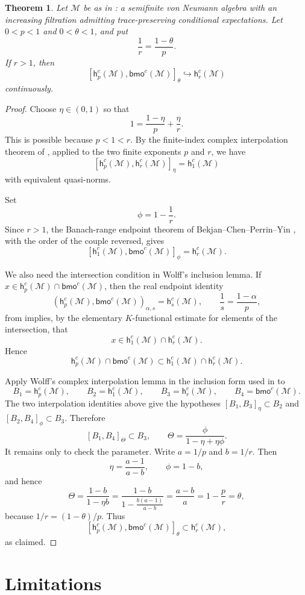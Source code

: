 \documentclass[11pt]{article}
\newcommand{\M}{\mathcal M}
\newcommand{\h}{\mathsf h}
\newcommand{\bmo}{\mathsf{bmo}}
\newtheorem{theorem}{Theorem}
\begin{document}
\begin{theorem}
Let \(\M\) be as in \cite{Ran2021}: a semifinite von Neumann algebra with an
increasing filtration admitting trace-preserving conditional expectations.
Let \(0<p<1\) and \(0<\theta<1\), and put
\[
  \frac1r=\frac{1-\theta}{p}.
\]
If \(r>1\), then
\[
[\h_p^c(\M),\bmo^c(\M)]_\theta
  \hookrightarrow \h_r^c(\M)
\]
continuously.
\end{theorem}

\begin{proof}
Choose \(\eta\in(0,1)\) so that
\[
  1=\frac{1-\eta}{p}+\frac{\eta}{r}.
\]
This is possible because \(p<1<r\).  By the finite-index complex
interpolation theorem of \cite[Theorem 3.16]{Ran2021}, applied to the two
finite exponents \(p\) and \(r\), we have
\[
[\h_p^c(\M),\h_r^c(\M)]_\eta=\h_1^c(\M)
\]
with equivalent quasi-norms.

Set
\[
  \phi=1-\frac1r.
\]
Since \(r>1\), the Banach-range endpoint theorem of
Bekjan--Chen--Perrin--Yin \cite[Theorem 4.4]{BCPY2009}, with the order of
the couple reversed, gives
\[
[\h_1^c(\M),\bmo^c(\M)]_\phi=\h_r^c(\M).
\]

We also need the intersection condition in Wolff's inclusion lemma.  If
\(x\in \h_p^c(\M)\cap\bmo^c(\M)\), then the real endpoint identity
\[
(\h_p^c(\M),\bmo^c(\M))_{\alpha,s}=\h_s^c(\M),
\qquad
\frac1s=\frac{1-\alpha}{p},
\]
from \cite[Theorem 3.5]{Ran2021} implies, by the elementary
\(K\)-functional estimate for elements of the intersection, that
\[
x\in \h_1^c(\M)\cap\h_r^c(\M).
\]
Hence
\[
\h_p^c(\M)\cap\bmo^c(\M)\subset \h_1^c(\M)\cap\h_r^c(\M).
\]

Apply Wolff's complex interpolation lemma in the inclusion form used in
\cite[Corollary 3.19]{Ran2021} to
\[
B_1=\h_p^c(\M),\qquad
B_2=\h_1^c(\M),\qquad
B_3=\h_r^c(\M),\qquad
B_4=\bmo^c(\M).
\]
The two interpolation identities above give the hypotheses
\([B_1,B_3]_\eta\subset B_2\) and \([B_2,B_4]_\phi\subset B_3\).  Therefore
\[
[B_1,B_4]_\Theta\subset B_3,
\qquad
\Theta=\frac{\phi}{1-\eta+\eta\phi}.
\]
It remains only to check the parameter.  Write \(a=1/p\) and \(b=1/r\).  Then
\[
\eta=\frac{a-1}{a-b},\qquad \phi=1-b,
\]
and hence
\[
\Theta
=\frac{1-b}{1-\eta b}
=\frac{1-b}{1-\frac{b(a-1)}{a-b}}
=\frac{a-b}{a}
=1-\frac{p}{r}
=\theta,
\]
because \(1/r=(1-\theta)/p\).  Thus
\[
[\h_p^c(\M),\bmo^c(\M)]_\theta\subset \h_r^c(\M),
\]
as claimed.
\end{proof}

\section*{Limitations}
\end{document}
